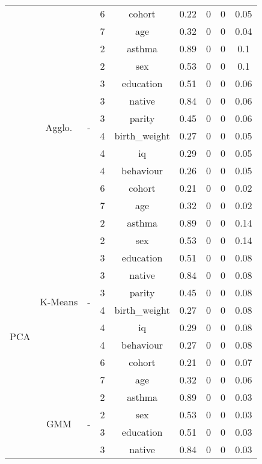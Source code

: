 \documentclass[CAT,BIB]{TFUOC}%
\begin{document}
\begin{table}
\begin{tabular}{@{}ccccccccc@{}}
            &  &  & 6 & cohort & 0.22 & 0 & 0 & 0.05 \\
            &  &  & 7 & age & 0.32 & 0 & 0 & 0.04 \\ \cmidrule(l){2-9}
            & \multirow{10}{*}{Agglo.} & \multirow{10}{*}{-} & 2 & asthma & 0.89 & 0 & 0 & 0.1 \\
            &  &  & 2 & sex & 0.53 & 0 & 0 & 0.1 \\
            &  &  & 3 & education & 0.51 & 0 & 0 & 0.06 \\
            &  &  & 3 & native & 0.84 & 0 & 0 & 0.06 \\
            &  &  & 3 & parity & 0.45 & 0 & 0 & 0.06 \\
            &  &  & 4 & birth\_weight & 0.27 & 0 & 0 & 0.05 \\
            &  &  & 4 & iq & 0.29 & 0 & 0 & 0.05 \\
            &  &  & 4 & behaviour & 0.26 & 0 & 0 & 0.05 \\
            &  &  & 6 & cohort & 0.21 & 0 & 0 & 0.02 \\
            &  &  & 7 & age & 0.32 & 0 & 0 & 0.02 \\ \midrule
            \multirow{30}{*}{PCA} & \multirow{10}{*}{K-Means} & \multirow{10}{*}{-} & 2 & asthma & 0.89 & 0 & 0 & 0.14 \\
            &  &  & 2 & sex & 0.53 & 0 & 0 & 0.14 \\
            &  &  & 3 & education & 0.51 & 0 & 0 & 0.08 \\
            &  &  & 3 & native & 0.84 & 0 & 0 & 0.08 \\
            &  &  & 3 & parity & 0.45 & 0 & 0 & 0.08 \\
            &  &  & 4 & birth\_weight & 0.27 & 0 & 0 & 0.08 \\
            &  &  & 4 & iq & 0.29 & 0 & 0 & 0.08 \\
            &  &  & 4 & behaviour & 0.27 & 0 & 0 & 0.08 \\
            &  &  & 6 & cohort & 0.21 & 0 & 0 & 0.07 \\
            &  &  & 7 & age & 0.32 & 0 & 0 & 0.06 \\ \cmidrule(l){2-9}
            & \multirow{10}{*}{GMM} & \multirow{10}{*}{-} & 2 & asthma & 0.89 & 0 & 0 & 0.03 \\
            &  &  & 2 & sex & 0.53 & 0 & 0 & 0.03 \\
            &  &  & 3 & education & 0.51 & 0 & 0 & 0.03 \\
            &  &  & 3 & native & 0.84 & 0 & 0 & 0.03 \\

\end{tabular}
\end{table}
\end{document}
